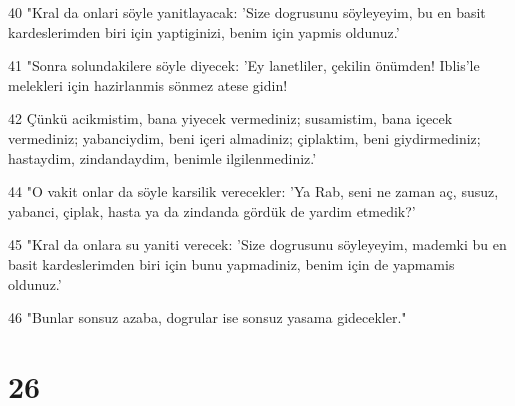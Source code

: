 \par 40 "Kral da onlari söyle yanitlayacak: 'Size dogrusunu söyleyeyim, bu en basit kardeslerimden biri için yaptiginizi, benim için yapmis oldunuz.'
\par 41 "Sonra solundakilere söyle diyecek: 'Ey lanetliler, çekilin önümden! Iblis'le melekleri için hazirlanmis sönmez atese gidin!
\par 42 Çünkü acikmistim, bana yiyecek vermediniz; susamistim, bana içecek vermediniz; yabanciydim, beni içeri almadiniz; çiplaktim, beni giydirmediniz; hastaydim, zindandaydim, benimle ilgilenmediniz.'
\par 44 "O vakit onlar da söyle karsilik verecekler: 'Ya Rab, seni ne zaman aç, susuz, yabanci, çiplak, hasta ya da zindanda gördük de yardim etmedik?'
\par 45 "Kral da onlara su yaniti verecek: 'Size dogrusunu söyleyeyim, mademki bu en basit kardeslerimden biri için bunu yapmadiniz, benim için de yapmamis oldunuz.'
\par 46 "Bunlar sonsuz azaba, dogrular ise sonsuz yasama gidecekler."

\chapter{26}

